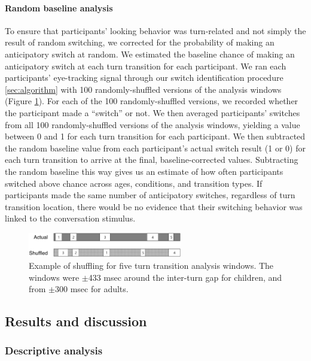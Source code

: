 \documentclass[authoryear, 12pt]{elsarticle}
\begin{document}
\paragraph{Random baseline analysis} To ensure that participants' looking behavior was turn-related and not simply the result of random switching, we corrected for the probability of making an anticipatory switch at random. We estimated the baseline chance of making an anticipatory switch at each turn transition for each participant. We ran each participants' eye-tracking signal through our switch identification procedure \ref{sec:algorithm} with 100 randomly-shuffled versions of the analysis windows (Figure \ref{fig:shuffling}). For each of the 100 randomly-shuffled versions, we recorded whether the participant made a ``switch'' or not. We then averaged participants' switches from all 100 randomly-shuffled versions of the analysis windows, yielding a value between 0 and 1 for each turn transition for each participant. We then subtracted the random baseline value from each participant's actual switch result (1 or 0) for each turn transition to arrive at the final, baseline-corrected values. Subtracting the random baseline this way gives us an estimate of how often participants switched above chance across ages, conditions, and transition types. If participants made the same number of anticipatory switches, regardless of turn transition location, there would be no evidence that their switching behavior was linked to the conversation stimulus.

\begin{figure}[t]
\begin{center}
\includegraphics[width=0.6\textwidth]{figures/FIG-ShuffledWindows.png}
\end{center}
\caption{Example of shuffling for five turn transition analysis windows. The windows were $\pm$433 msec around the inter-turn gap for children, and from $\pm$300 msec for adults.} 
\label{fig:shuffling}
\end{figure}

\subsection{Results and discussion}
\label{sec:results1}

\subsubsection{Descriptive analysis}
\end{document}
